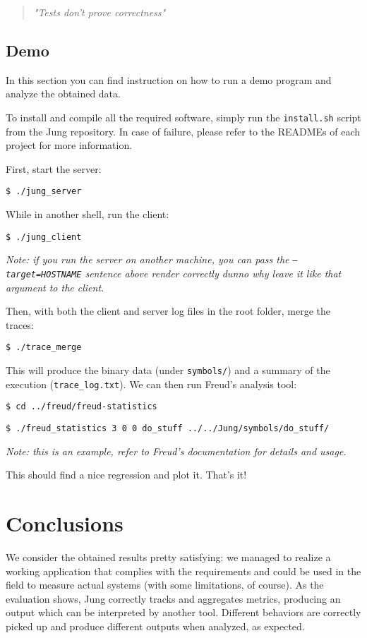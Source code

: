 \documentclass[11pt,english,singlespacing,headsepline,consistentlayout]{auxiliary/si-msc-thesis}
\begin{document}
\begin{quote} \centering \textit{"Tests don't prove
    correctness"}
\end{quote}


\section{Demo}

In this section you can find instruction on how to run a demo
program and analyze the obtained data.

To install and compile all the required software, simply run the
\texttt{install.sh} script from the Jung repository.  In case of
failure, please refer to the READMEs of each project for more
information.

First, start the server:

\texttt{\$ ./jung\_server}

While in another shell, run the client:

\texttt{\$ ./jung\_client}

\textit{Note: if you run the server on another machine, you
  can pass the \texttt{---target=HOSTNAME} %
  sentence above render correctly dunno why leave it like that argument
  to the client.}

Then, with both the client and server log files in the root
folder, merge the traces:

\texttt{\$ ./trace\_merge}

This will produce the binary data (under \texttt{symbols/})
and a summary of the execution (\texttt{trace\_log.txt}).  We can then
run Freud's analysis tool:

\texttt{\$ cd ../freud/freud-statistics}

\texttt{\$ ./freud\_statistics 3 0 0 do\_stuff
  ../../Jung/symbols/do\_stuff/}

\textit{Note: this is an example, refer to Freud's
  documentation for details and usage.}

This should find a nice regression and plot it. That's it!


\chapter{Conclusions}


We consider the obtained results pretty satisfying: we managed to
realize a working application that complies with the requirements and
could be used in the field to measure actual systems (with some
limitations, of course). As the evaluation shows, Jung correctly
tracks and aggregates metrics, producing an output which can be
interpreted by another tool. Different behaviors are correctly picked
up and produce different outputs when analyzed, as expected.
\end{document}
